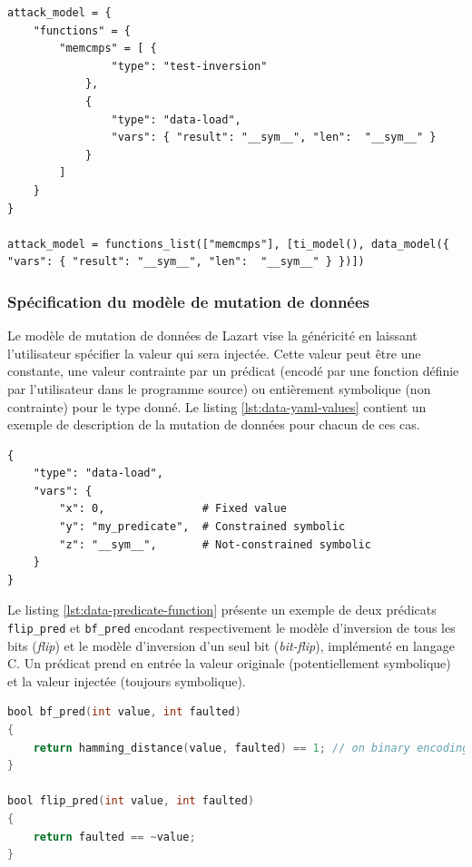 \begin{lstlisting}  
attack_model = {
    "functions" = {
        "memcmps" = [ {
                "type": "test-inversion"
            },
            { 
                "type": "data-load",
                "vars": { "result": "__sym__", "len":  "__sym__" }
            }
        ]
    }
}

attack_model = functions_list(["memcmps"], [ti_model(), data_model({ "vars": { "result": "__sym__", "len":  "__sym__" } })])
\end{lstlisting} 
                
            \subsubsection{Spécification du modèle de mutation de données}
            \label{sec:data-value}
        
                Le modèle de mutation de données de Lazart vise la généricité en laissant l'utilisateur spécifier la valeur qui sera injectée. Cette valeur peut être une constante, une valeur contrainte par un prédicat (encodé par une fonction définie par l'utilisateur dans le programme source) ou entièrement symbolique (non contrainte) pour le type donné. 
                Le listing \ref{lst:data-yaml-values} contient un exemple de description de la mutation de données pour chacun de ces cas.
    
\begin{lstlisting}  
{
    "type": "data-load",
    "vars": {
        "x": 0,               # Fixed value
        "y": "my_predicate",  # Constrained symbolic
        "z": "__sym__",       # Not-constrained symbolic
    }
}
\end{lstlisting}                 
                    
                Le listing \ref{lst:data-predicate-function} présente un exemple de deux prédicats \texttt{flip\_pred} et \texttt{bf\_pred} encodant respectivement le modèle d'inversion de tous les bits (\textit{flip}) et le modèle d'inversion d'un seul bit (\textit{bit-flip}), implémenté en langage C. Un prédicat prend en entrée la valeur originale (potentiellement symbolique) et la valeur injectée (toujours symbolique). 
               
\begin{lstlisting}[caption={Prédicat pour le modèle \textit{bit-flip}}, label=lst:data-predicate-function, language=C,style=codeC]
bool bf_pred(int value, int faulted)
{
    return hamming_distance(value, faulted) == 1; // on binary encoding.
}

bool flip_pred(int value, int faulted)
{
    return faulted == ~value;
}
\end{lstlisting}        
                    
